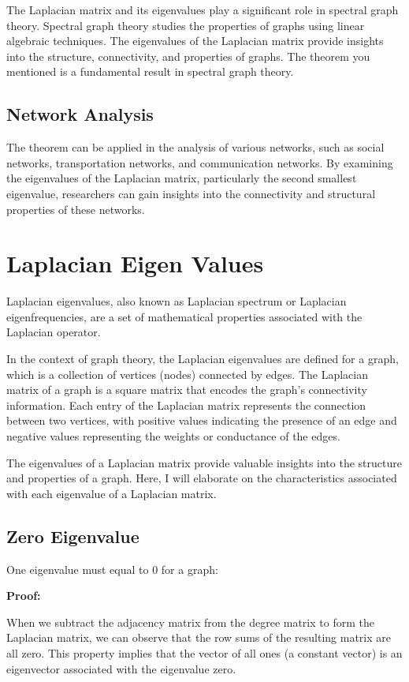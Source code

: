 \documentclass{article}
\begin{document}
    The Laplacian matrix and its eigenvalues play a significant role in spectral graph theory. Spectral graph theory studies the properties of graphs using linear algebraic techniques. The eigenvalues of the Laplacian matrix provide insights into the structure, connectivity, and properties of graphs. The theorem you mentioned is a fundamental result in spectral graph theory.
    
    \subsection{Network Analysis}
    
    The theorem can be applied in the analysis of various networks, such as social networks, transportation networks, and communication networks. By examining the eigenvalues of the Laplacian matrix, particularly the second smallest eigenvalue, researchers can gain insights into the connectivity and structural properties of these networks.


\section{Laplacian Eigen Values}
Laplacian eigenvalues, also known as Laplacian spectrum or Laplacian eigenfrequencies, are a set of mathematical properties associated with the Laplacian operator.

In the context of graph theory, the Laplacian eigenvalues are defined for a graph, which is a collection of vertices (nodes) connected by edges. The Laplacian matrix of a graph is a square matrix that encodes the graph's connectivity information. Each entry of the Laplacian matrix represents the connection between two vertices, with positive values indicating the presence of an edge and negative values representing the weights or conductance of the edges.

The eigenvalues of a Laplacian matrix provide valuable insights into the structure and properties of a graph. Here, I will elaborate on the characteristics associated with each eigenvalue of a Laplacian matrix.

\subsection{Zero Eigenvalue}

One eigenvalue must equal to 0 for a graph:

    \textbf{Proof:}
    
    When we subtract the adjacency matrix from the degree matrix to form the Laplacian matrix, we can observe that the row sums of the resulting matrix are all zero. This property implies that the vector of all ones (a constant vector) is an eigenvector associated with the eigenvalue zero.
    
\end{document}
